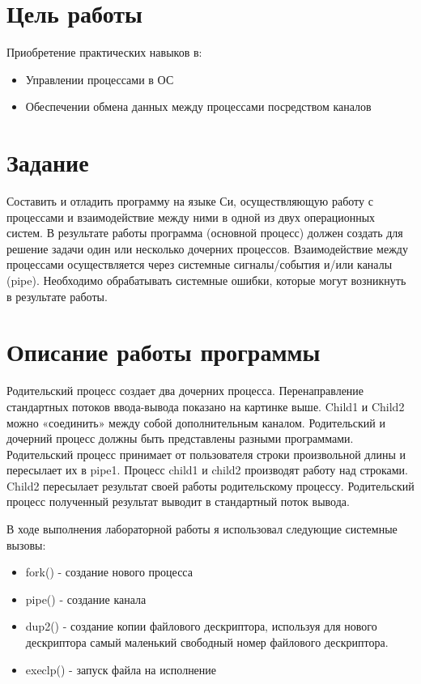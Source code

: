 \documentclass[a4paper, 12pt]{article}
\begin{document}
\section{Цель работы}
Приобретение практических навыков в:
\begin{itemize}
  \item Управлении процессами в ОС
  \item Обеспечении обмена данных между процессами посредством каналов
\end{itemize}

\section{Задание}
Составить и отладить программу на языке Си, осуществляющую работу с процессами и 
взаимодействие между ними в одной из двух операционных систем. В результате работы 
программа (основной процесс) должен создать для решение задачи один или несколько 
дочерних процессов. Взаимодействие между процессами осуществляется через системные 
сигналы/события и/или каналы (pipe).
Необходимо обрабатывать системные ошибки, которые могут возникнуть в результате работы.

\section{Описание работы программы}
Родительский процесс создает два дочерних процесса. Перенаправление стандартных потоков
ввода-вывода показано на картинке выше. Child1 и Child2 можно «соединить» между собой
дополнительным каналом. Родительский и дочерний процесс должны быть представлены
разными программами.
Родительский процесс принимает от пользователя строки произвольной длины и пересылает их в
pipe1. Процесс child1 и child2 производят работу над строками. Child2 пересылает результат своей
работы родительскому процессу. Родительский процесс полученный результат выводит в
стандартный поток вывода.

В ходе выполнения лабораторной работы я использовал следующие системные вызовы:
\begin{itemize}
  \item fork() - создание нового процесса
  \item pipe() - создание канала
  \item dup2() - создание копии файлового дескриптора, используя для нового дескриптора самый маленький свободный номер файлового дескриптора.
  \item execlp() - запуск файла на исполнение
\end{itemize}
\end{document}
